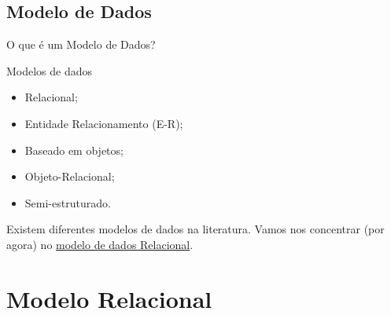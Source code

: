 \documentclass[xcolor=x11names,compress]{beamer}
\begin{document}
\subsection{Modelo de Dados}
\begin{frame}{O que é um Modelo de Dados?}


\end{frame}

\begin{frame}{Modelos de dados}

\begin{itemize}
\itemsep 5mm

\item Relacional;

\item Entidade Relacionamento (E-R);

\item Baseado em objetos;

\item Objeto-Relacional;

\item Semi-estruturado.

\end{itemize}


Existem diferentes modelos de dados na literatura. Vamos nos concentrar (por agora) no \underline{modelo de dados Relacional}.

\end{frame}


\section{Modelo Relacional}
\end{document}
